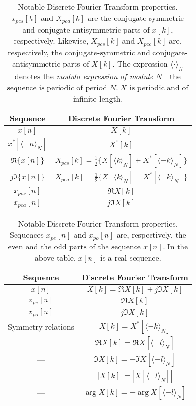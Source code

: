 \documentclass[\documentfontsize, twocolumn]{\classname}
\begin{document}
\begin{table*}[ht]
\centering
\begin{tabular}{c c}
    \hline
    \textbf{Sequence} & \textbf{Discrete Fourier Transform} \\
    \hline
    $x[n]$  & $X[k]$ \\
    \hline
    $x^*[\langle -n\rangle_N]$ & $X^*[k]$ \\
    $\Re{\{x[n]\}}$ & $X_{pcs}[k] = \frac 1 2 \{X[\langle k\rangle_N] + X^*[\langle -k \rangle_N]\}$\\
    $j\Im{\{x[n]\}}$ & $X_{pca}[k] = \frac 1 2 \{X[\langle k\rangle_N] - X^*[\langle -k\rangle_N]\}$\\
    $x_{pcs}[n]$ & $\Re{X[k]}$ \\
    $x_{pca}[n]$ & $j\Im{X[k]}$ \\
    \hline
\end{tabular}
\caption{Notable Discrete Fourier Transform properties. $x_{pcs}[k]$ and $X_{pca}[k]$ are the conjugate-symmetric and conjugate-antisymmetric parts of $x[k]$, respectively. Likewise, $X_{pcs}[k]$ and $X_{pca}[k]$ are, respectively, the conjugate-symmetric and conjugate-antisymmetric parts of $X[k]$. The expression $\langle \cdot \rangle_N$ denotes the \emph{modulo expression of module $N$}---the sequence is periodic of period $N$. $X$ is periodic and of infinite length.}\label{tab:discreteFourierTransformPropertiesAndTheorems}
\end{table*}

\begin{table*}[ht]
\centering
\begin{tabular}{c c}
    \hline
    \textbf{Sequence} & \textbf{Discrete Fourier Transform} \\
    \hline
    $x[n]$ & $X[k] = \Re{X[k]} + j\Im{X[k]}$ \\
    \hline
    $x_{pe}[n]$ & $\Re{X[k]}$ \\
    $x_{po}[n]$ & $j\Im {X[k]}$ \\
    \hline
    Symmetry relations & $X[k] = X^*[\langle -k\rangle_N]$ \\
    --- & $\Re X[k] = \Re X[\langle -l\rangle_N]$ \\
    --- & $\Im X[k] = -\Im X[\langle -l \rangle_N]$ \\
    --- & $|X[k]| = |X[\langle -l \rangle_N]|$ \\
    --- & $\arg{X[k]} = -\arg{X[\langle -l \rangle_N]}$ \\
    \hline
\end{tabular}
\caption{Notable Discrete Fourier Transform properties. Sequences $x_{pe}[n]$ and $x_{po}[n]$ are, respectively, the even and the odd parts of the sequence $x[n]$. In the above table, $x[n]$ is a real sequence.}\label{tab:discreteFourierTransformPropertiesAndTheorems2}
\end{table*}
\end{document}
